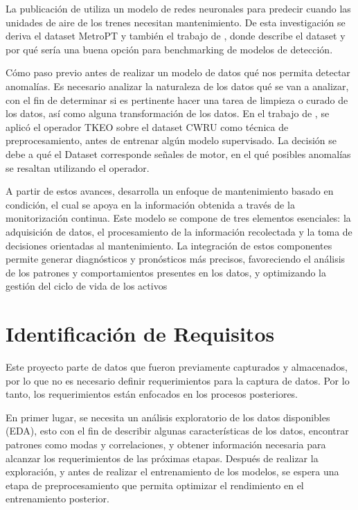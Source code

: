 \documentclass[11pt,a4paper,spanish]{book}
\numberwithin{equation}{chapter}
\numberwithin{figure}{chapter}
\begin{document}
La publicación de \cite{davari2021} utiliza un modelo de redes neuronales para predecir 
cuando las unidades de aire de los trenes necesitan mantenimiento. De esta investigación 
se deriva el dataset MetroPT y también el trabajo de  \cite{veloso2022metrpt}, donde 
describe el dataset y por qué sería una buena opción para benchmarking de modelos de 
detección.


Cómo paso previo antes de realizar un modelo de datos qué nos permita detectar anomalías.
Es necesario analizar la naturaleza de los datos qué se van a analizar, con el fin de 
determinar si es pertinente hacer una tarea de limpieza o curado de los datos, así como 
alguna transformación de los datos. En el trabajo de \cite{yu2025tkeo}, se aplicó el 
operador TKEO sobre el dataset CWRU como técnica de preprocesamiento, antes de entrenar 
algún modelo supervisado. La decisión se debe a qué el Dataset corresponde  señales de 
motor, en el qué posibles anomalías se resaltan utilizando el operador.


A partir de estos avances, \cite{jardine2006review} desarrolla un enfoque de 
mantenimiento basado en condición, el cual se apoya en la información obtenida a 
través de la monitorización continua. Este modelo se compone de tres elementos 
esenciales: la adquisición de datos, el procesamiento de la información recolectada y 
la toma de decisiones orientadas al mantenimiento. La integración de estos componentes 
permite generar diagnósticos y pronósticos más precisos, favoreciendo el análisis de 
los patrones y comportamientos presentes en los datos, y optimizando la gestión del 
ciclo de vida de los activos \cite{jardine2006review}


\chapter{Identificación de Requisitos}


Este proyecto parte de datos que fueron previamente capturados y almacenados, por lo 
que no es necesario definir requerimientos para la captura de datos. Por lo tanto, los 
requerimientos están enfocados en los procesos posteriores. 


En primer lugar,  se necesita un análisis exploratorio de los datos disponibles (EDA), 
esto con el fin de describir algunas características de los datos, encontrar patrones 
como modas y correlaciones, y obtener información necesaria para alcanzar los 
requerimientos de las próximas etapas.  Después de realizar la exploración, y antes de 
realizar el entrenamiento de los modelos, se espera una etapa de preprocesamiento que 
permita optimizar el rendimiento en el entrenamiento posterior.
\end{document}
